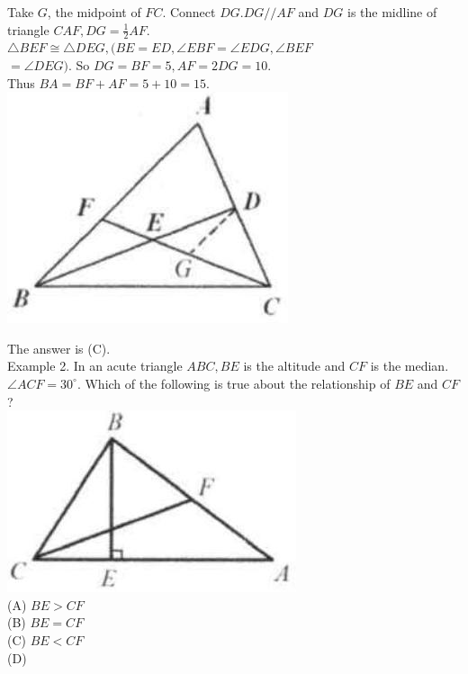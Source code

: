\documentclass[10pt]{article}
\begin{document}
Take \(G\), the midpoint of \(F C\). Connect \(D G . D G / / A F\) and \(D G\) is the midline of triangle \(C A F, D G=\frac{1}{2} A F\).\\
\(\triangle B E F \cong \triangle D E G,(B E=E D, \angle E B F=\angle E D G, \angle B E F\)\\
\(=\angle D E G)\). So \(D G=B F=5, A F=2 D G=10\).\\
Thus \(B A=B F+A F=5+10=15\).\\
\includegraphics[max width=\textwidth, center]{2025_04_17_97bc1f7e44d93c271a88g-035(2)}

The answer is (C).\\
Example 2. In an acute triangle \(A B C, B E\) is the altitude and \(C F\) is the median. \(\angle A C F=30^{\circ}\). Which of the following is true about the relationship of \(B E\) and \(C F\) ?\\
\includegraphics[max width=\textwidth, center]{2025_04_17_97bc1f7e44d93c271a88g-035}\\
(A) \(B E>C F\)\\
(B) \(B E=C F\)\\
(C) \(B E<C F\)\\
(D)
\end{document}
